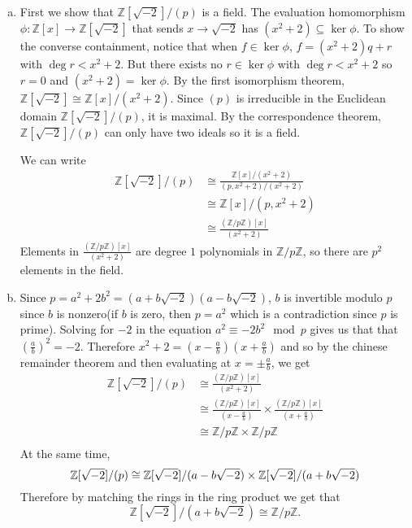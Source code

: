\documentclass{article}
\begin{document}
\begin{enumerate}[(a)]
	\item First we show that $\mathbb{Z}[\sqrt{-2}]/(p)$ is a field.
	The evaluation homomorphism $\phi: \mathbb{Z}[x] \to \mathbb{Z}[\sqrt{-2}]$ that sends $x \to \sqrt{-2}$
	has $(x^2+2) \subseteq \ker \phi$. 
	To show the converse containment, notice that when $f \in \ker \phi$, $f = (x^2+2)q + r$ with $\deg r < x^2+2$.
	But there exists no $r \in \ker \phi$ with $\deg r < x^2+2$ so $r = 0$ and $(x^2+2) = \ker \phi$. 
	By the first isomorphism theorem, $\mathbb{Z}[\sqrt{-2}] \cong \mathbb{Z}[x]/(x^2+2)$.
	Since $(p)$ is irreducible in the Euclidean domain $\mathbb{Z}[\sqrt{-2}]/(p)$, it is maximal.
	By the correspondence theorem, $\mathbb{Z}[\sqrt{-2}]/(p)$ can only have two ideals so it is a field.

	We can write 
	\begin{align*}
		\mathbb{Z}[\sqrt{-2}]/(p) &\cong \frac{\mathbb{Z}[x]/(x^2+2)}{(p, x^2+2)/(x^2+2)} \\
		&\cong \mathbb{Z}[x]/(p, x^2+2) \\
		&\cong \frac{(\mathbb{Z}/p\mathbb{Z})[x]}{(x^2+2)}
	\end{align*}
	Elements in $\frac{(\mathbb{Z}/p\mathbb{Z})[x]}{(x^2+2)}$ are degree $1$ polynomials in $\mathbb{Z}/p\mathbb{Z}$, so there are $p^2$ elements in the field.
	\item Since $p = a^2 + 2b^2 = (a+b\sqrt{-2})(a-b\sqrt{-2})$, 
	$b$ is invertible modulo $p$ since $b$ is nonzero(if $b$ is zero, then $p=a^2$ which is a contradiction since $p$ is prime).
	Solving for $-2$ in the equation $a^2  \equiv - 2b^2 \mod p$ gives us that
	that $\left(\frac{a}{b}\right)^{2} = -2$.
	Therefore $x^2 + 2 = (x - \frac{a}{b})(x + \frac{a}{b})$ and so by the chinese remainder theorem and then evaluating at $x = \pm \frac{a}{b}$, we get
	\begin{align*}
		\mathbb{Z}[\sqrt{-2}]/(p) &\cong  \frac{(\mathbb{Z}/p\mathbb{Z})[x]}{(x^2+2)} \\
		&\cong \frac{(\mathbb{Z}/p\mathbb{Z})[x]}{(x - \frac{a}{b})} \times \frac{(\mathbb{Z}/p\mathbb{Z})[x]}{(x + \frac{a}{b})} \\
		&\cong \mathbb{Z}/p\mathbb{Z} \times \mathbb{Z}/p\mathbb{Z} \\
	\end{align*}
	At the same time,
	\[
		\mathbb{Z}[\sqrt{-2}]/(p) \cong \mathbb{Z}[\sqrt{-2}]/(a-b\sqrt{-2}) \times \mathbb{Z}[\sqrt{-2}]/(a+b\sqrt{-2}) \\
	\]
	Therefore by matching the rings in the ring product we get that
	\[
		\mathbb{Z}[\sqrt{-2}]/(a+b\sqrt{-2}) \cong \mathbb{Z}/p\mathbb{Z}.
	\]

\end{enumerate}
\newpage
\end{document}
